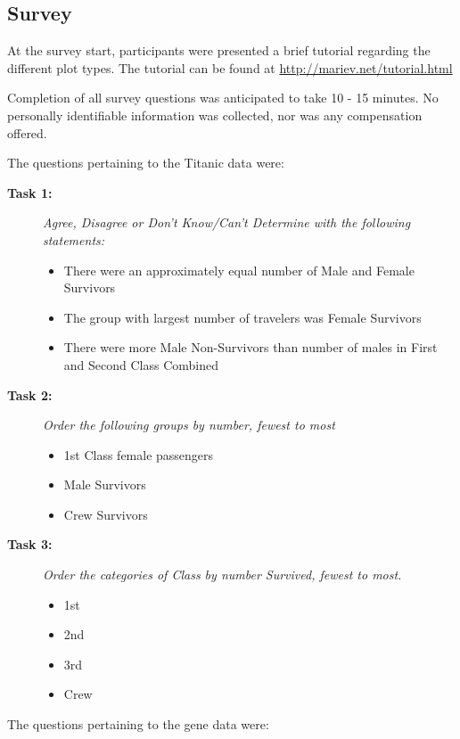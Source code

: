 \documentclass[journal]{vgtc}\usepackage{graphicx, color}
\begin{document}
\begin{appendix}%
\section{Survey }\label{app2}

At the survey start, participants were presented a brief tutorial regarding the different plot types. The tutorial can be found at \url{http://mariev.net/tutorial.html}

Completion of all survey questions was anticipated to take 10 - 15 minutes.
No personally identifiable information was collected, nor was any compensation offered.   

\noindent The questions pertaining to the Titanic data were: 
\begin{description}
\item[\bf Task 1: ]\emph{ Agree, Disagree or Don't Know/Can't Determine with the following statements:}
\begin{itemize}
\item There were an approximately equal number of Male and Female Survivors
\item The group with largest number of travelers was Female Survivors
\item There were more Male Non-Survivors than number of males in First and Second Class Combined
\end{itemize}

\item[\bf Task 2: ]\emph{ Order the following groups by number, fewest to most}
\begin{itemize}
\item 1st Class female passengers
\item Male Survivors
\item Crew Survivors
\end{itemize}

\item[\bf Task 3: ]\emph{ Order the categories of Class by number Survived, fewest to most.} 
\begin{itemize}
\item 1st
\item 2nd 
\item 3rd
\item Crew
\end{itemize}
\end{description}


\noindent The questions pertaining to the gene data were: 



\end{appendix}
\end{document}
